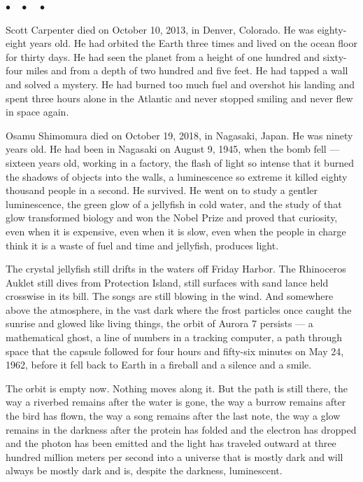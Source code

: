 \documentclass[12pt, letterpaper]{article}
\begin{document}
\begin{center}
$\bullet\quad\bullet\quad\bullet$
\end{center}

Scott Carpenter died on October 10, 2013, in Denver, Colorado. He was eighty-eight years old. He had orbited the Earth three times and lived on the ocean floor for thirty days. He had seen the planet from a height of one hundred and sixty-four miles and from a depth of two hundred and five feet. He had tapped a wall and solved a mystery. He had burned too much fuel and overshot his landing and spent three hours alone in the Atlantic and never stopped smiling and never flew in space again.

Osamu Shimomura died on October 19, 2018, in Nagasaki, Japan. He was ninety years old. He had been in Nagasaki on August 9, 1945, when the bomb fell --- sixteen years old, working in a factory, the flash of light so intense that it burned the shadows of objects into the walls, a luminescence so extreme it killed eighty thousand people in a second. He survived. He went on to study a gentler luminescence, the green glow of a jellyfish in cold water, and the study of that glow transformed biology and won the Nobel Prize and proved that curiosity, even when it is expensive, even when it is slow, even when the people in charge think it is a waste of fuel and time and jellyfish, produces light.

The crystal jellyfish still drifts in the waters off Friday Harbor. The Rhinoceros Auklet still dives from Protection Island, still surfaces with sand lance held crosswise in its bill. The songs are still blowing in the wind. And somewhere above the atmosphere, in the vast dark where the frost particles once caught the sunrise and glowed like living things, the orbit of Aurora 7 persists --- a mathematical ghost, a line of numbers in a tracking computer, a path through space that the capsule followed for four hours and fifty-six minutes on May 24, 1962, before it fell back to Earth in a fireball and a silence and a smile.

The orbit is empty now. Nothing moves along it. But the path is still there, the way a riverbed remains after the water is gone, the way a burrow remains after the bird has flown, the way a song remains after the last note, the way a glow remains in the darkness after the protein has folded and the electron has dropped and the photon has been emitted and the light has traveled outward at three hundred million meters per second into a universe that is mostly dark and will always be mostly dark and is, despite the darkness, luminescent.
\end{document}
